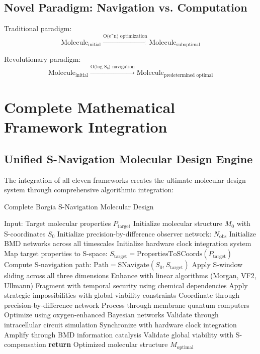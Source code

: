 \documentclass[11pt,a4paper]{article}
\begin{document}
\subsection{Novel Paradigm: Navigation vs. Computation}

Traditional paradigm:
\begin{equation}
\text{Molecule}_{\text{initial}} \xrightarrow{\text{O(e^n) optimization}} \text{Molecule}_{\text{suboptimal}}
\end{equation}

Revolutionary paradigm:
\begin{equation}
\text{Molecule}_{\text{initial}} \xrightarrow{\text{O(log S₀) navigation}} \text{Molecule}_{\text{predetermined optimal}}
\end{equation}

\section{Complete Mathematical Framework Integration}

\subsection{Unified S-Navigation Molecular Design Engine}

The integration of all eleven frameworks creates the ultimate molecular design system through comprehensive algorithmic integration:

\begin{algorithm}
\caption{Complete Borgia S-Navigation Molecular Design}
\begin{algorithmic}[1]
\STATE Input: Target molecular properties $P_{\text{target}}$
\STATE Initialize molecular structure $M_0$ with S-coordinates $S_0$
\STATE Initialize precision-by-difference observer network: $N_{\text{obs}}$
\STATE Initialize BMD networks across all timescales
\STATE Initialize hardware clock integration system
\STATE Map target properties to S-space: $S_{\text{target}} = \text{PropertiesToSCoords}(P_{\text{target}})$
\STATE Compute S-navigation path: $\text{Path} = \text{SNavigate}(S_0, S_{\text{target}})$
    \STATE Apply S-window sliding across all three dimensions
    \STATE Enhance with linear algorithms (Morgan, VF2, Ullmann)
    \STATE Fragment with temporal security using chemical dependencies
    \STATE Apply strategic impossibilities with global viability constraints
    \STATE Coordinate through precision-by-difference network
    \STATE Process through membrane quantum computers
    \STATE Optimize using oxygen-enhanced Bayesian networks
    \STATE Validate through intracellular circuit simulation
    \STATE Synchronize with hardware clock integration
    \STATE Amplify through BMD information catalysis
    \STATE Validate global viability with S-compensation
\ENDFOR
\STATE \textbf{return} Optimized molecular structure $M_{\text{optimal}}$
\end{algorithmic}
\end{algorithm}
\end{document}
